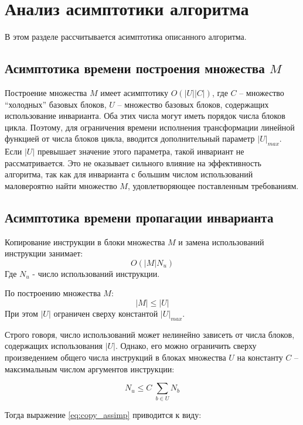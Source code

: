 \section{Анализ асимптотики алгоритма}

В этом разделе рассчитывается асимптотика описанного алгоритма.

\subsection{Асимптотика времени построения множества $M$}
Построение множества $M$ имеет асимптотику $ O(|U| |C|) $, где $C$ -- множество \enquote{холодных} базовых блоков, $U$ -- множество базовых блоков, содержащих использование инварианта.
Оба этих числа могут иметь порядок числа блоков цикла.
Поэтому, для ограничения времени исполнения трансформации линейной функцией от числа блоков цикла, вводится дополнительный параметр $|U|_{max}$.
Если $|U|$ превышает значение этого параметра, такой инвариант не рассматривается.
Это не оказывает сильного влияние на эффективность алгоритма, так как для инварианта с большим числом использований маловероятно найти множество $M$, удовлетворяющее поставленным требованиям.

\subsection{Асимптотика времени пропагации инварианта}

Копирование инструкции в блоки множества $M$ и замена использований инструкции занимает:
\begin{equation} \label{eq:copy_assimp}
    O(|M| N_u)
\end{equation}
Где $N_u$ - число использований инструкции.

По построению множества $M$:
$$ |M| \leq |U| $$
При этом $|U|$ ограничен сверху константой $|U|_{max}$.

Строго говоря, число использований может нелинейно зависеть от числа блоков, содержащих использования $|U|$.
Однако, его можно ограничить сверху произведением общего числа инструкций в блоках множества $U$ на константу $C$ -- максимальным числом аргументов инструкции:

\begin{equation} \label{eq:sum_leq_one}
N_u \leq C \; \sum_{b \in U} N_b
\end{equation}

Тогда выражение \ref{eq:copy_assimp} приводится к виду:

